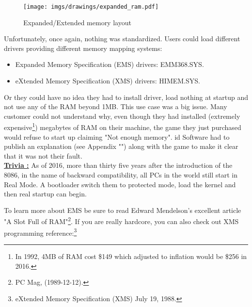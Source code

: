 \documentclass[book.tex]{subfiles}
\begin{document}
\begin{figure}[H]
\centering
\texttt{[image: imgs/drawings/expanded\_ram.pdf]}
\caption{Expanded/Extended memory layout}
\label{fig:ems_xms_layout}
\end{figure}
Unfortunately, once again, nothing was standardized. Users could load different drivers providing different memory mapping systems:
\begin{itemize}
\item Expanded Memory Specification (EMS) drivers: EMM368.SYS.
\item eXtended Memory Specification (XMS) drivers: HIMEM.SYS.
\end{itemize}

Or they could have no idea they had to install driver, load nothing at startup and not use any of the RAM beyond 1MB. This use case was a big issue. Many customer could not understand why, even though they had installed (extremely expensive\footnote{In 1992, 4MB of RAM cost \$149 which adjusted to inflation would be \$256 in 2016.}) megabytes of RAM on their machine, the game they just purchased would refuse to start up claiming "Not enough memory". id Software had to publish an explanation (see Appendix "") along with the game to make it clear that it was not their fault.\\

\textbf{\underline{Trivia :}}  As of 2016, more than thirty five years after the introduction of the 8086, in the name of backward compatibility, all PCs in the world still start in Real Mode. A bootloader switch them to protected mode, load the kernel and then real startup can begin.

\bigskip
To learn more about EMS be sure to read Edward Mendelson's excellent article "A Slot Full of RAM"\footnote{PC Mag, (1989-12-12).}. If you are really hardcore, you can also check out XMS programming reference:\footnote{eXtended Memory Specification (XMS) July 19, 1988.}\\
\par
\end{document}
